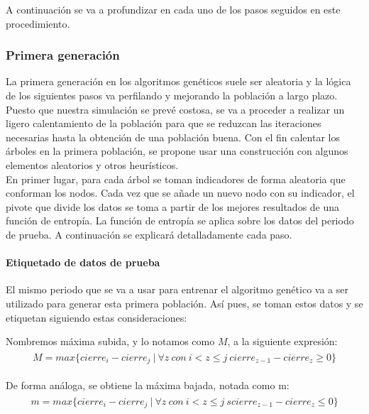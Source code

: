 A continuaci\'on se va a profundizar en cada uno de los pasos seguidos en este procedimiento.

\subsubsection{Primera generaci\'on}
La primera generaci\'on en los algoritmos gen\'eticos suele ser aleatoria y la l\'ogica de los siguientes pasos va perfilando y mejorando la poblaci\'on a largo plazo.\\

Puesto que nuestra simulaci\'on se prev\'e costosa, se va a proceder a realizar un ligero calentamiento de la poblaci\'on para que se reduzcan las iteraciones necesarias hasta la obtenci\'on de una poblaci\'on buena. Con el fin calentar los \'arboles en la primera poblaci\'on, se propone usar una construcci\'on con algunos elementos aleatorios y otros heur\'isticos.\\

En primer lugar, para cada \'arbol se toman indicadores de forma aleatoria que conforman los nodos. Cada vez que se a\~nade un nuevo nodo con su indicador, el pivote que divide los datos se toma a partir de los mejores resultados de una funci\'on de entrop\'ia. La funci\'on de entrop\'ia se aplica sobre los datos del periodo de prueba. A continuaci\'on se explicar\'a detalladamente cada paso. 

\paragraph{Etiquetado de datos de prueba}
El mismo periodo que se va a usar para entrenar el algoritmo gen\'etico va a ser utilizado para generar esta primera poblaci\'on. As\'i pues, se toman estos datos y se etiquetan siguiendo estas consideraciones:

    Nombremos m\'axima subida, y lo notamos como $M$, a la siguiente expresi\'on:\\
    \begin{align*}
    \begin{split}
        M = max\{cierre_{i} - cierre_{j} \:|\: \forall z\: con \:i < z\leq j\: cierre_{z-1} - cierre_{z} \geq 0 \}
    \end{split}
    \end{align*}
    
    De forma an\'aloga, se obtiene la m\'axima bajada, notada como m:
    \begin{align*}
    \begin{split}
        m = max\{cierre_{i} - cierre_{j} \:|\: \forall z\: con \:i < z\leq j\:s cierre_{z-1} - cierre_{z} \leq 0 \}
    \end{split}
    \end{align*}

